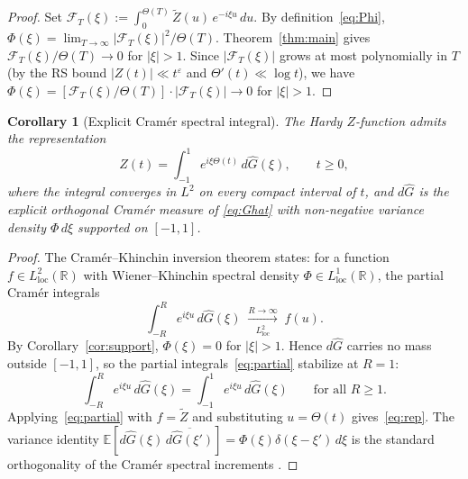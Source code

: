 \documentclass[12pt]{amsart}
\newtheorem{corollary}[theorem]{Corollary}
\theoremstyle{definition}
\theoremstyle{remark}
\newcommand{\R}{\mathbb{R}}
\newcommand{\Th}{\Theta}
\newcommand{\Zt}{\widetilde{Z}}
\begin{document}
\begin{proof}
Set $\mathcal{F}_T(\xi):=\int_0^{\Th(T)}\Zt(u)\,e^{-i\xi u}\,du$.
By definition~\eqref{eq:Phi},
$\Phi(\xi)=\lim_{T\to\infty}|\mathcal{F}_T(\xi)|^2/\Th(T)$.
Theorem~\ref{thm:main} gives $\mathcal{F}_T(\xi)/\Th(T)\to 0$ for
$|\xi|>1$.  Since $|\mathcal{F}_T(\xi)|$ grows at most polynomially in
$T$ (by the RS bound $|Z(t)|\ll t^{\varepsilon}$ and
$\Th'(t)\ll\log t$), we have
$\Phi(\xi)=[\mathcal{F}_T(\xi)/\Th(T)]\cdot|\mathcal{F}_T(\xi)|\to 0$
for $|\xi|>1$.
\end{proof}

\begin{corollary}[Explicit Cram\'{e}r spectral integral]\label{cor:rep}
The Hardy $Z$-function admits the representation
\begin{equation}\label{eq:rep}
  Z(t) = \int_{-1}^{1} e^{i\xi\Th(t)}\,d\hat G(\xi),
  \qquad t\ge 0,
\end{equation}
where the integral converges in $L^2$ on every compact interval of $t$,
and $d\hat G$ is the explicit orthogonal Cram\'{e}r measure of
\eqref{eq:Ghat} with non-negative variance density $\Phi\,d\xi$
supported on $[-1,1]$.
\end{corollary}

\begin{proof}
The Cram\'{e}r--Khinchin inversion theorem \cite{Cramer1942} states:
for a function $f\in L^2_{\mathrm{loc}}(\R)$ with Wiener--Khinchin
spectral density $\Phi\in L^1_{\mathrm{loc}}(\R)$, the partial Cram\'{e}r
integrals
\begin{equation}\label{eq:partial}
  \int_{-R}^{R} e^{i\xi u}\,d\hat G(\xi)
  \;\xrightarrow[L^2_{\mathrm{loc}}]{R\to\infty}\; f(u).
\end{equation}
By Corollary~\ref{cor:support}, $\Phi(\xi)=0$ for $|\xi|>1$.
Hence $d\hat G$ carries no mass outside $[-1,1]$, so the partial
integrals~\eqref{eq:partial} stabilize at $R=1$:
\[
  \int_{-R}^{R} e^{i\xi u}\,d\hat G(\xi)
  = \int_{-1}^{1} e^{i\xi u}\,d\hat G(\xi)
  \qquad\text{for all }R\ge 1.
\]
Applying~\eqref{eq:partial} with $f=\Zt$ and substituting $u=\Th(t)$
gives~\eqref{eq:rep}.
The variance identity
$\mathbb{E}[d\hat G(\xi)\,\overline{d\hat G(\xi')}]
=\Phi(\xi)\delta(\xi-\xi')\,d\xi$
is the standard orthogonality of the Cram\'{e}r spectral increments
\cite{Cramer1942}.
\end{proof}
\end{document}

